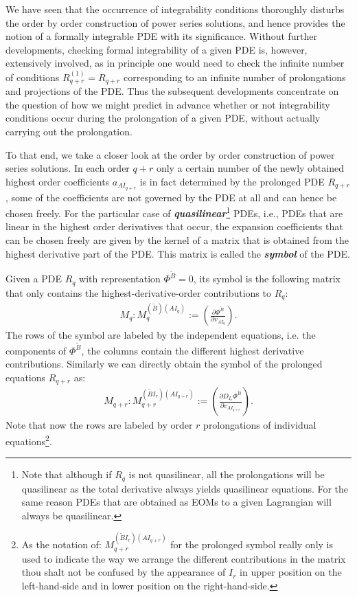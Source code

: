 We have seen that the occurrence of integrability conditions thoroughly disturbs the order by order construction of power series solutions, and hence provides the notion of a formally integrable PDE with its significance. Without further developments, checking formal integrability of a given PDE is, however, extensively involved, as in principle one would need to check the infinite number of conditions $R_{q+r}^{(1)} = R_{q+r}$ corresponding to an infinite number of prolongations and projections of the PDE. Thus the subsequent developments concentrate on the question of how we might predict in advance whether or not integrability conditions occur during the prolongation of a given PDE, without actually carrying out the prolongation.

To that end, we take a closer look at the order by order construction of power series solutions.
In each order $q+r$ only a certain number of the newly obtained highest order coefficients $a_{AI_{q+r}}$ is in fact determined by the prolonged PDE $R_{q+r}$, some of the coefficients are not governed by the PDE at all and can hence be chosen freely.
For the particular case of \textit{\textbf{quasilinear}}\footnote{Note that although if $R_q$ is not quasilinear, all the prolongations will be quasilinear as the total derivative always yields quasilinear equations. For the same reason PDEs that are obtained as EOMs to a given Lagrangian will always be quasilinear.} PDEs, i.e., PDEs that are linear in the highest order derivatives that occur, the expansion coefficients that can be chosen freely are given by the kernel of a matrix that is obtained from the highest derivative part of the PDE. This matrix is called the \textit{\textbf{symbol}} of the PDE.
\begin{definition}[symbol]
Given a PDE $R_q$ with representation $\Phi^{\tilde{B}}=0$, its symbol is the following matrix that only contains the highest-derivative-order contributions to $R_q$:
\begin{align}
    M_q : M_q^{(\tilde{B})({AI_q})} := \left ( \frac{\partial \Phi^{\tilde{B}}}{\partial v_{AI_q}} \right ).
\end{align}
The rows of the symbol are labeled by the independent equations, i.e. the components of $\Phi^{\tilde{B}}$, the columns contain the different highest derivative contributions.
Similarly we can directly obtain the symbol of the prolonged equations $R_{q+r}$ as:
\begin{align}\label{proSym}
    M_{q+r} : M_{q+r} ^{(\tilde{B}I_r) (AI_{q+r})}:= \left ( \frac{\partial D_{I_r}\Phi^{\tilde{B}
    }}{\partial v_{AI_{q+r}}} \right ). 
\end{align}
Note that now the rows are labeled by order $r$ prolongations of individual equations\footnote{As the notation of: $M_{q+r} ^{(\tilde{B}I_r) (AI_{q+r})}$ for the prolonged symbol really only is used to indicate the way we arrange the different contributions in the matrix thou shalt not be confused by the appearance of $I_r$ in upper position on the left-hand-side and in lower position on the right-hand-side.}.
\end{definition}
